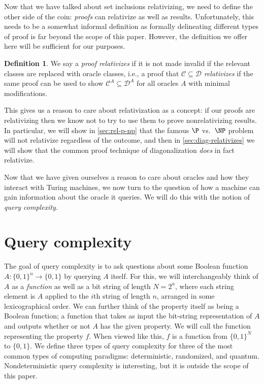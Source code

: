 \documentclass[english,12pt]{reedthesis}
\theoremstyle{plain}
\theoremstyle{definition}
\newtheorem{defn}[defn]{Definition}
\theoremstyle{remark}
\begin{document}
Now that we have talked about set inclusions relativizing, we need to define the
other side of the coin: \emph{proofs} can relativize as well as results.
Unfortunately, this needs to be a somewhat informal definition as formally
delineating different types of proof is far beyond the scope of this paper.
However, the definition we offer here will be sufficient for our purposes.

\begin{defn}\label{def:relativizing-result}
  We say a \emph{proof relativizes} if it is not made invalid if the relevant
  classes are replaced with oracle classes, i.e., a proof that $\mathcal{C} \subseteq \mathcal{D}$
  \emph{relativizes} if the same proof can be used to show $\mathcal{C}^{A} \subseteq \mathcal{D}^{A}$ for
  all oracles $A$ with minimal modifications.
\end{defn}

This gives us a reason to care about relativization as a concept: if our proofs
are relativizing then we know not to try to use them to prove nonrelativizing
results. In particular, we will show in \cref{sec:rel-p-np} that the famous $\P$
vs.\ $\NP$ problem will not relativize regardless of the outcome, and then in
\cref{sec:diag-relativizes} we will show that the common proof technique of
diagonalization \emph{does} in fact relativize.

Now that we have given ourselves a reason to care about oracles and how they
interact with Turing machines, we now turn to the question of how a machine can
gain information about the oracle it queries. We will do this with the notion of
\emph{query complexity}.

\section{Query complexity}\label{sec:query-complexity}

The goal of query complexity is to ask questions about some Boolean function
$A\colon \{0, 1\}^{n} \rightarrow \{0, 1\}$ by querying $A$ itself. For this, we will
interchangeably think of $A$ as a \emph{function} as well as a bit string of
length $N = 2^{n}$, where each string element is $A$ applied to the $i$th string
of length $n$, arranged in some lexicographical
order. %
We can further think of the property itself as being a Boolean function; a
function that takes as input the bit-string representation of $A$ and outputs
whether or not $A$ has the given property. We will call the function
representing the property $f$. When viewed like this, $f$ is a function from
$\{0, 1\}^{N}$ to $\{0, 1\}$. We define three types of query complexity for
three of the most common types of computing paradigms: deterministic,
randomized, and quantum. Nondeterministic query complexity is interesting, but
it is outside the scope of this paper.
\end{document}
